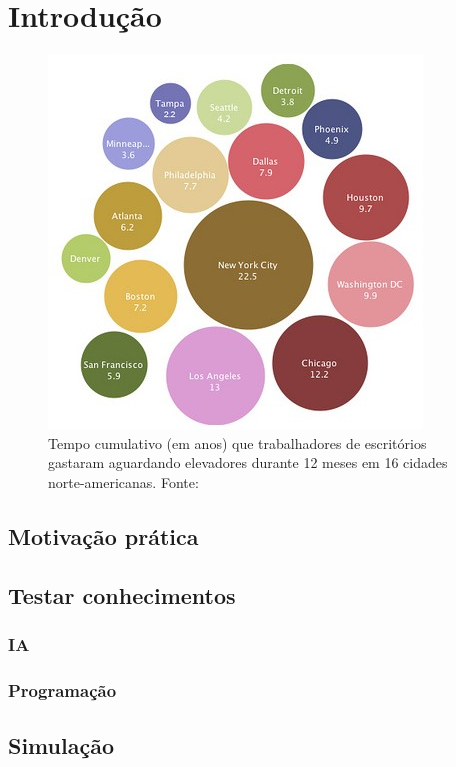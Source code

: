 \chapter{\label{chap:intro}Introdução}

\begin{figure}[htb!]
\centering\includegraphics{img/time-cost.jpg}
\caption{\label{fig:fig1}Tempo cumulativo (em anos) que trabalhadores de escritórios gastaram aguardando elevadores durante 12 meses em 16 cidades norte-americanas. Fonte:\cite{HORN10}}
\end{figure}

\cite{MCGAR15}

\section{Motivação prática}
\section{Testar conhecimentos}
\subsection{IA}
\subsection{Programação}
\section{Simulação}